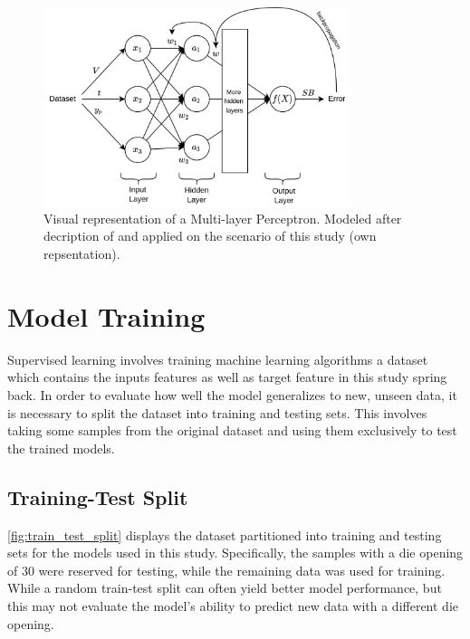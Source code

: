 \begin{figure}[h]
    \begin{tcolorbox}[arc=0pt,boxrule=0.5pt]
        \centering
        \includegraphics[width=0.8\textwidth]{chap4/images/mlp_example}
    \end{tcolorbox}
    \caption{Visual representation of a Multi-layer Perceptron. Modeled after decription of
    \cite{nielsen2015neural} and applied on the scenario of this study
        (own repsentation). }
    \label{fig:mlp-example}
\end{figure}


\section{Model Training}\label{sec:model-training}
Supervised learning involves training machine learning algorithms a dataset which contains the inputs features as well
as target feature in this study spring back.
In order to evaluate how well the model generalizes to new, unseen data, it is necessary to
split the dataset into training and testing sets.
This involves taking some samples from the original dataset and using them exclusively to test the trained models.

\subsection{Training-Test Split}\label{subsec:training-test-split}
\cref{fig:train_test_split} displays the dataset partitioned into training and testing sets for the models used in
this study.
Specifically, the samples with a die opening of 30 were reserved for testing, while the remaining data was used for
training.
While a random train-test split can often yield better model performance, but this may not evaluate the model's ability
to predict new data with a different die opening.

